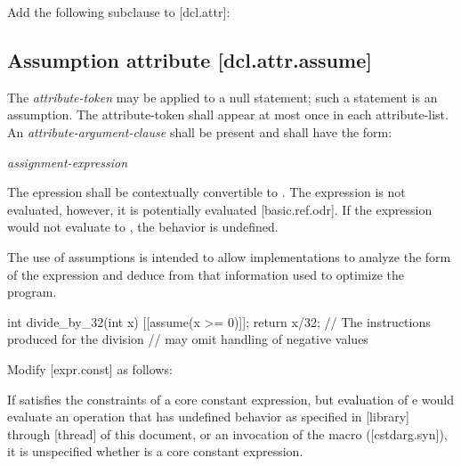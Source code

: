 Add the following subclause to [dcl.attr]:

\begin{adjustwidth}{0.5cm}{0.5cm}
\begin{addedblock}
\subsection*{Assumption attribute \hspace{7.33cm} [dcl.attr.assume]}

The \textit{attribute-token}  may be applied to a null statement; such a statement is an assumption. The attribute-token  shall appear at most once in each attribute-list. An \textit{attribute-argument-clause} shall be present and shall have the form:

\hspace{5mm}\tcode{( }\textit{assignment-expression}\tcode{ )}

The epression shall be contextually convertible to . The expression is not evaluated, however, it is potentially evaluated [basic.ref.odr]. If the expression would not evaluate to , the behavior is undefined.


\begin{note}
The use of assumptions is intended to allow implementations to analyze the form of the expression and deduce from that information used to optimize the program.
\end{note}

\begin{example}
\begin{codeblock}
int divide_by_32(int x)  {
    [[assume(x >= 0)]];
    return x/32;   // The instructions produced for the division
                   //  may omit handling of negative values
}
\end{codeblock}
\end{example}
\end{addedblock}
\end{adjustwidth}

Modify [expr.const] as follows:

\begin{adjustwidth}{0.5cm}{0.5cm}
If  satisfies the constraints of a core constant expression, but evaluation of e would evaluate an operation that has undefined behavior as specified in [library] through [thread] of this document, or an invocation of the  macro ([cstdarg.syn]), it is unspecified whether  is a core constant expression.
\end{adjustwidth}

